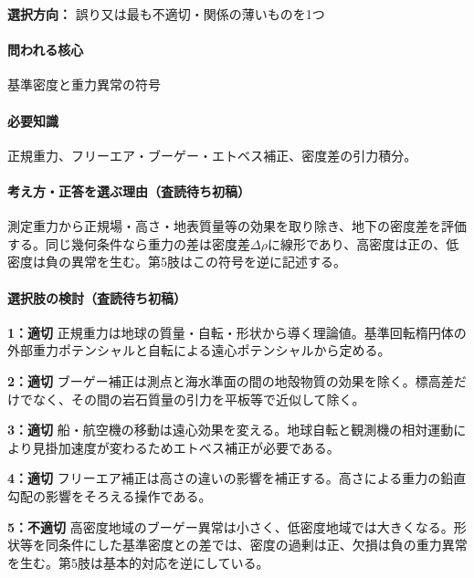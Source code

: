 \noindent\textbf{選択方向：} 誤り又は最も不適切・関係の薄いものを1つ\par

\paragraph{問われる核心} 基準密度と重力異常の符号

\paragraph{必要知識} 正規重力、フリーエア・ブーゲー・エトベス補正、密度差の引力積分。

\paragraph{考え方・正答を選ぶ理由（査読待ち初稿）} 測定重力から正規場・高さ・地表質量等の効果を取り除き、地下の密度差を評価する。同じ幾何条件なら重力の差は密度差\(\Delta\rho\)に線形であり、高密度は正の、低密度は負の異常を生む。第5肢はこの符号を逆に記述する。

\paragraph{選択肢の検討（査読待ち初稿）}\mbox{}\par

\noindent\textbf{1：適切} 正規重力は地球の質量・自転・形状から導く理論値。基準回転楕円体の外部重力ポテンシャルと自転による遠心ポテンシャルから定める。\par

\noindent\textbf{2：適切} ブーゲー補正は測点と海水準面の間の地殻物質の効果を除く。標高差だけでなく、その間の岩石質量の引力を平板等で近似して除く。\par

\noindent\textbf{3：適切} 船・航空機の移動は遠心効果を変える。地球自転と観測機の相対運動により見掛加速度が変わるためエトベス補正が必要である。\par

\noindent\textbf{4：適切} フリーエア補正は高さの違いの影響を補正する。高さによる重力の鉛直勾配の影響をそろえる操作である。\par

\noindent\textbf{5：不適切} 高密度地域のブーゲー異常は小さく、低密度地域では大きくなる。形状等を同条件にした基準密度との差では、密度の過剰は正、欠損は負の重力異常を生む。第5肢は基本的対応を逆にしている。\par

